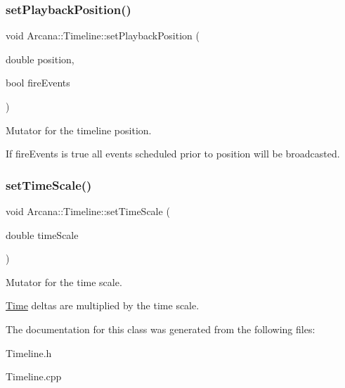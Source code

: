 \subsubsection{\texorpdfstring{set\+Playback\+Position()}{setPlaybackPosition()}}
{\footnotesize\ttfamily void Arcana\+::\+Timeline\+::set\+Playback\+Position (\begin{DoxyParamCaption}\item[{double}]{position,  }\item[{bool}]{fire\+Events }\end{DoxyParamCaption})}



Mutator for the timeline position. 

If fire\+Events is \textquotesingle{}true\textquotesingle{} all events scheduled prior to \textquotesingle{}position\textquotesingle{} will be broadcasted. \mbox{\label{class_arcana_1_1_timeline_aec6c9fdd12143c467202658b39fb62e8}} 
\subsubsection{\texorpdfstring{set\+Time\+Scale()}{setTimeScale()}}
{\footnotesize\ttfamily void Arcana\+::\+Timeline\+::set\+Time\+Scale (\begin{DoxyParamCaption}\item[{double}]{time\+Scale }\end{DoxyParamCaption})}



Mutator for the time scale. 

\mbox{\hyperlink{class_arcana_1_1_time}{Time}} deltas are multiplied by the time scale. 

The documentation for this class was generated from the following files\+:\begin{DoxyCompactItemize}
\item 
Timeline.\+h\item 
Timeline.\+cpp\end{DoxyCompactItemize}
